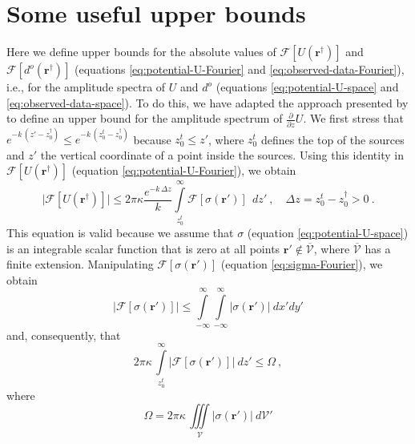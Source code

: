 \section{Some useful upper bounds}
\label{app:upper-bounds}

Here we define upper bounds for the absolute values
of $\mathcal{F} [ U(\mathbf{r}^{\dagger}) ]$ and $\mathcal{F} [ d^{o}(\mathbf{r}^{\dagger}) ]$ 
(equations \ref{eq:potential-U-Fourier} and \ref{eq:observed-data-Fourier}), 
i.e., for the amplitude spectra of $U$ and $d^{o}$ 
(equations \ref{eq:potential-U-space} and \ref{eq:observed-data-space}). 
To do this, we have adapted the approach presented by
 to define an upper bound for the amplitude spectrum of 
$\tfrac{\partial}{\partial z} U$. 
We first stress that 
$e^{- k \, (z' - z^{\dagger}_{0})} \le e^{- k \, (z^{t}_{0} - z^{\dagger}_{0})}$ because
$z^{t}_{0} \le z'$, where $z^{t}_{0}$ defines the top of the sources and $z'$ the vertical
coordinate of a point inside the sources. Using this identity in  
$\mathcal{F} [ U(\mathbf{r}^{\dagger}) ]$ (equation \ref{eq:potential-U-Fourier}), we obtain
\begin{equation}
	\vert \mathcal{F} [ U(\mathbf{r}^{\dagger}) ] \vert \le 2 \pi \kappa 
	\frac{e^{- k \, \Delta z}}{k}
	\int\limits_{z^{t}_{0}}^{\infty}
	\mathcal{F} [ \sigma(\mathbf{r}') ] \:
	\: dz' \: , \quad \Delta z = z^{t}_{0} - z^{\dagger}_{0} > 0 \: .
	\label{eq:potential-U-spectrum-bound1}
\end{equation}
This equation is valid because we assume that $\sigma$ (equation \ref{eq:potential-U-space}) 
is an integrable scalar function that is zero at all points $\mathbf{r}' \notin \overline{\mathcal{V}}$, 
where $\overline{\mathcal{V}}$ has a finite extension. 
Manipulating $\mathcal{F} [ \sigma(\mathbf{r}') ]$ (equation \ref{eq:sigma-Fourier}), 
we obtain
\begin{equation}
	\vert \mathcal{F} [ \sigma(\mathbf{r}') ] \vert \le
	\int\limits_{-\infty}^{\infty}\int\limits_{-\infty}^{\infty}
	\vert \sigma(\mathbf{r}') \vert 
	\: dx'dy'
	\label{eq:sigma-spectrum-bound}
\end{equation}
and, consequently, that
\begin{equation}
	2 \pi \kappa \, 
	\int\limits_{z^{t}_{0}}^{\infty}
	\vert \mathcal{F} [ \sigma(\mathbf{r}') ] \vert
	\: dz' \le \Omega \: ,
	\label{eq:Omega-bound}
\end{equation}
where
\begin{equation}
	\Omega = 2 \pi \kappa \, \iiint\limits_{\mathcal{V}}
	\vert \sigma(\mathbf{r}') \vert 
	\: d\mathcal{V}'
	\label{eq:Omega}
\end{equation}
